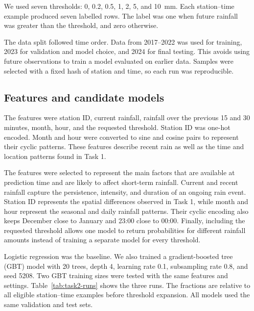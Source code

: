 \documentclass[11pt]{article}
\begin{document}
We used seven thresholds: 0, 0.2, 0.5, 1, 2, 5, and 10~mm. Each station--time
example produced seven labelled rows. The label was one when future rainfall
was greater than the threshold, and zero otherwise.

The data split followed time order. Data from 2017--2022 was used for training,
2023 for validation and model choice, and 2024 for final testing. This avoids
using future observations to train a model evaluated on earlier data. Samples
were selected with a fixed hash of station and time, so each run was
reproducible.

\subsection{Features and candidate models}

The features were station ID, current rainfall, rainfall over the previous 15
and 30 minutes, month, hour, and the requested threshold. Station ID was
one-hot encoded. Month and hour were converted to sine and cosine pairs to
represent their cyclic patterns. These features describe recent rain as well
as the time and location patterns found in Task 1.

The features were selected to represent the main factors that are available at
prediction time and are likely to affect short-term rainfall. Current and
recent rainfall capture the persistence, intensity, and duration of an ongoing
rain event. Station ID represents the spatial differences observed in Task 1,
while month and hour represent the seasonal and daily rainfall patterns. Their
cyclic encoding also keeps December close to January and 23:00 close to 00:00.
Finally, including the requested threshold allows one model to return
probabilities for different rainfall amounts instead of training a separate
model for every threshold.

Logistic regression was the baseline. We also trained a gradient-boosted tree
(GBT) model with 20 trees, depth 4, learning rate 0.1, subsampling rate 0.8,
and seed 5208. Two GBT training sizes were tested with the same features and
settings. Table~\ref{tab:task2-runs} shows the three runs. The fractions are
relative to all eligible station--time examples before threshold expansion.
All models used the same validation and test sets.
\end{document}
